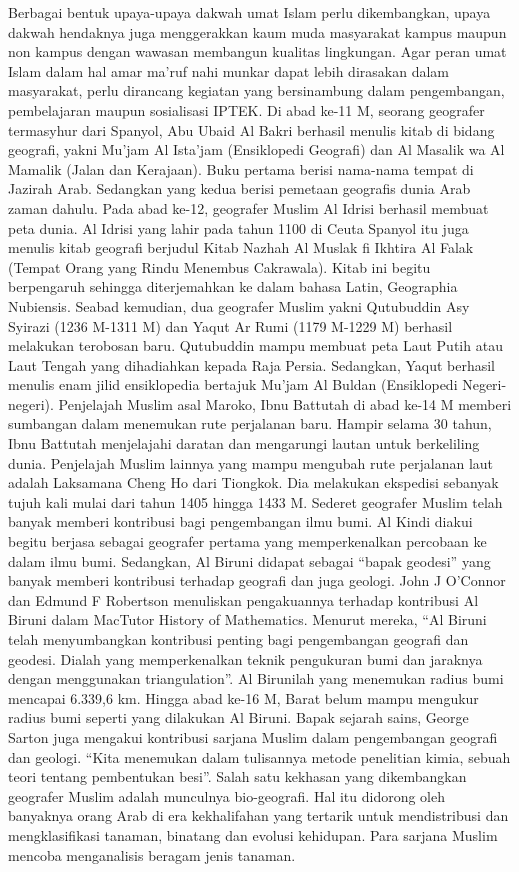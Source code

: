 	Berbagai bentuk upaya-upaya dakwah umat Islam perlu dikembangkan, upaya dakwah hendaknya juga menggerakkan kaum muda masyarakat kampus maupun non kampus dengan wawasan membangun kualitas lingkungan. Agar peran umat Islam dalam hal amar ma’ruf nahi munkar dapat lebih dirasakan dalam masyarakat, perlu dirancang kegiatan yang bersinambung dalam pengembangan, pembelajaran maupun sosialisasi IPTEK. 
	Di abad ke-11 M, seorang geografer termasyhur dari Spanyol, Abu Ubaid Al Bakri berhasil menulis kitab di bidang geografi, yakni Mu’jam Al Ista’jam (Ensiklopedi Geografi) dan Al Masalik wa Al Mamalik (Jalan dan Kerajaan). Buku pertama berisi nama-nama tempat di Jazirah Arab. Sedangkan yang kedua berisi pemetaan geografis dunia Arab zaman dahulu.
	Pada abad ke-12, geografer Muslim Al Idrisi berhasil membuat peta dunia. Al Idrisi yang lahir pada tahun 1100 di Ceuta Spanyol itu juga menulis kitab geografi berjudul Kitab Nazhah Al Muslak fi Ikhtira Al Falak (Tempat Orang yang Rindu Menembus Cakrawala). Kitab ini begitu berpengaruh sehingga diterjemahkan ke dalam bahasa Latin, Geographia Nubiensis.
	Seabad kemudian, dua geografer Muslim yakni Qutubuddin Asy Syirazi (1236 M-1311 M) dan Yaqut Ar Rumi (1179 M-1229 M) berhasil melakukan terobosan baru. Qutubuddin mampu membuat peta Laut Putih atau Laut Tengah yang dihadiahkan kepada Raja Persia. Sedangkan, Yaqut berhasil menulis enam jilid ensiklopedia bertajuk Mu’jam Al Buldan (Ensiklopedi Negeri-negeri).
	Penjelajah Muslim asal Maroko, Ibnu Battutah di abad ke-14 M memberi sumbangan dalam menemukan rute perjalanan baru. Hampir selama 30 tahun, Ibnu Battutah menjelajahi daratan dan mengarungi lautan untuk berkeliling dunia. Penjelajah Muslim lainnya yang mampu mengubah rute perjalanan laut adalah Laksamana Cheng Ho dari Tiongkok. Dia melakukan ekspedisi sebanyak tujuh kali mulai dari tahun 1405 hingga 1433 M.
	Sederet geografer Muslim telah banyak memberi kontribusi bagi pengembangan ilmu bumi. Al Kindi diakui begitu berjasa sebagai geografer pertama yang memperkenalkan percobaan ke dalam ilmu bumi. Sedangkan, Al Biruni didapat sebagai “bapak geodesi” yang banyak memberi kontribusi terhadap geografi dan juga geologi.
	John J O’Connor dan Edmund F Robertson menuliskan pengakuannya terhadap kontribusi Al Biruni dalam MacTutor History of Mathematics. Menurut mereka, “Al Biruni telah menyumbangkan kontribusi penting bagi pengembangan geografi dan geodesi. Dialah yang memperkenalkan teknik pengukuran bumi dan jaraknya dengan menggunakan triangulation”.
	Al Birunilah yang menemukan radius bumi mencapai 6.339,6 km. Hingga abad ke-16 M, Barat belum mampu mengukur radius bumi seperti yang dilakukan Al Biruni. Bapak sejarah sains, George Sarton juga mengakui kontribusi sarjana Muslim dalam pengembangan geografi dan geologi. “Kita menemukan dalam tulisannya metode penelitian kimia, sebuah teori tentang pembentukan besi”.
	Salah satu kekhasan yang dikembangkan geografer Muslim adalah munculnya bio-geografi. Hal itu didorong oleh banyaknya orang Arab di era kekhalifahan yang tertarik untuk mendistribusi dan mengklasifikasi tanaman, binatang dan evolusi kehidupan. Para sarjana Muslim mencoba menganalisis beragam jenis tanaman.



